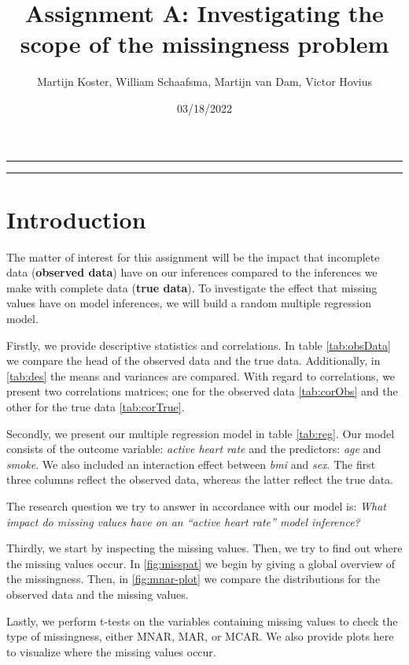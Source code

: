 \documentclass[
]{article}
\title{Assignment A: Investigating the scope of the missingness problem}
\author{Martijn Koster, William Schaafsma, Martijn van Dam, Victor Hovius}
\date{03/18/2022}
\begin{document}
\maketitle

{
\setcounter{tocdepth}{2}
\tableofcontents
}
\begin{center}\rule{0.5\linewidth}{0.5pt}\end{center}

\begin{center}\rule{0.5\linewidth}{0.5pt}\end{center}

\hypertarget{intro}{%
\section{Introduction}\label{intro}}

The matter of interest for this assignment will be the impact that incomplete data (\textbf{observed data}) have on our inferences compared to the inferences we make with complete data (\textbf{true data}). To investigate the effect that missing values have on model inferences, we will build a random multiple regression model.

Firstly, we provide descriptive statistics and correlations. In table \ref{tab:obsData} we compare the head of the observed data and the true data. Additionally, in \ref{tab:des} the means and variances are compared. With regard to correlations, we present two correlations matrices; one for the observed data \ref{tab:corObs} and the other for the true data \ref{tab:corTrue}.

Secondly, we present our multiple regression model in table \ref{tab:reg}. Our model consists of the outcome variable: \emph{active heart rate} and the predictors: \emph{age} and \emph{smoke}. We also included an interaction effect between \emph{bmi} and \emph{sex}. The first three columns reflect the observed data, whereas the latter reflect the true data.

The research question we try to answer in accordance with our model is: \emph{What impact do missing values have on an ``active heart rate'' model inference?}

Thirdly, we start by inspecting the missing values. Then, we try to find out where the missing values occur. In \ref{fig:misspat} we begin by giving a global overview of the missingness. Then, in \ref{fig:mnar-plot} we compare the distributions for the observed data and the missing values.

Lastly, we perform t-tests on the variables containing missing values to check the type of missingness, either MNAR, MAR, or MCAR. We also provide plots here to visualize where the missing values occur.
\end{document}
